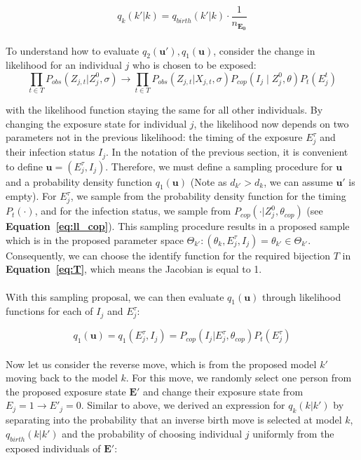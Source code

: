 \documentclass{article}
\begin{document}
\begin{equation}
q_k(k' | k) = q_{birth}(k' |k)\cdot \frac{1}{n_{\mathbf{E_0}}}
\end{equation}

\paragraph{}To understand how to evaluate $q_2(\mathbf{u}'), q_1(\mathbf{u})$, consider the change in likelihood for an individual $j$ who is chosen to be exposed:
\begin{equation}
\prod_{t \in T}P_{obs}(Z_{j,t}|Z^0_{j}, \sigma)  \rightarrow  \prod_{t \in T}P_{obs}(Z_{j,t}|X_{j,t}, \sigma)P_{cop}(I_j \mid Z^0_{j}, \theta)P_t(E_j^t)
\end{equation}

with the likelihood function staying the same for all other individuals. By changing the exposure state for individual $j$, the likelihood now depends on two parameters not in the previous likelihood: the timing of the exposure $E^\tau_j$ and their infection status $I_j$. In the notation of the previous section, it is convenient to define $\mathbf{u} = (E^\tau_j, I_j)$. Therefore, we must define a sampling procedure for $\mathbf{u}$ and a probability density function $q_1(\mathbf{u})$ (Note as $d_{k'} > d_k$, we can assume $\mathbf{u'}$ is empty).  For $E^\tau_j$, we sample from the probability density function for the timing $P_t(\cdot)$, and for the infection status, we sample from $P_{cop}(\cdot | Z_j^0, \theta_{cop})$ (see \textbf{Equation~\ref{eq:ll_cop}}). This sampling procedure results in a proposed sample which is in the proposed parameter space $\Theta_{k'}: (\theta_k, E^\tau_j, I_j) = \theta_{k'} \in \Theta_{k'}$. Consequently, we can choose the identify function for the required bijection $T$ in \textbf{Equation~\ref{eq:T}}, which means the Jacobian is equal to 1.

\paragraph{}With this sampling proposal, we can then evaluate $q_1(\mathbf{u})$ through likelihood functions for each of $I_j$ and $E^\tau_j$:

\begin{equation}
q_1(\mathbf{u}) = q_1(E^\tau_j, I_j) = P_{cop}(I_j | E_j^\tau, \theta_{cop})P_t(E^\tau_j)
\end{equation}

\paragraph{}Now let us consider the reverse move, which is from the proposed model $k'$ moving back to the model $k$. For this move, we randomly select one person from the proposed exposure state $\mathbf{E'}$ and change their exposure state from $E_j = 1 \rightarrow E'_j = 0$. Similar to above, we derived an expression for $q_k(k | k')$ by separating into the probability that an inverse birth move is selected at model $k$, $q_{birth}(k |k')$ and the probability of choosing individual $j$ uniformly from the exposed individuals of $\mathbf{E}'$:
\end{document}
